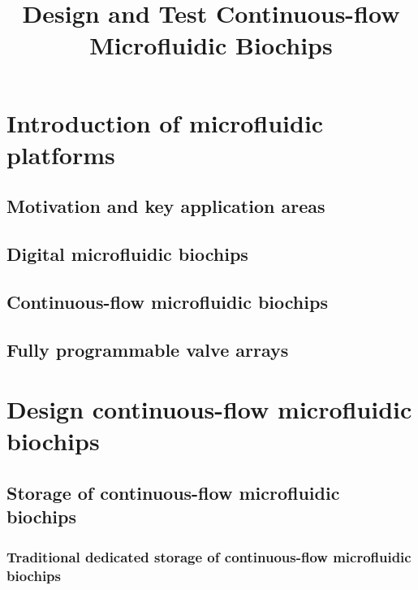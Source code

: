 \documentclass{article}
\begin{document}
\title{Design and Test Continuous-flow Microfluidic Biochips}
\maketitle
\tableofcontents
\newpage



\section{Introduction of microfluidic platforms}
  \subsection{Motivation and key application areas}
  \subsection{Digital microfluidic biochips}
  \subsection{Continuous-flow microfluidic biochips}
  \subsection{Fully programmable valve arrays}

\section{Design continuous-flow microfluidic biochips}

  \subsection{Storage of continuous-flow microfluidic biochips}
    \subsubsection{Traditional dedicated storage of continuous-flow microfluidic biochips}
\end{document}
